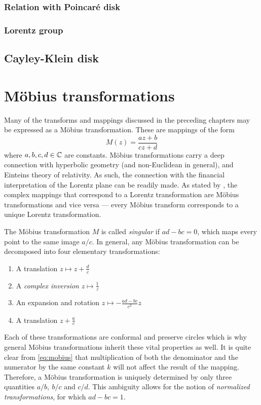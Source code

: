 \subsubsection{Relation with Poincaré disk}

\subsubsection{Lorentz group}

\subsection{Cayley-Klein disk}

\section{Möbius transformations}
\label{sec:mobius}
Many of the transforms and mappings discussed in the preceding chapters may be expressed as a Möbius transformation. These are mappings of the form \cite{Needham1997}
\begin{equation}
    M(z) = \frac{az + b}{cz + d}
    \label{eq:mobius}
\end{equation}
where \(a, b, c, d \in \mathbb{C} \) are constants. Möbius transformations carry a deep connection with hyperbolic geometry (and non-Euclidean in general), and Einteins theory of relativity. As such, the connection with the financial interpretation of the Lorentz plane can be readily made. As stated by \citet{Needham1997}, the complex mappings that correspond to a Lorentz transformation are Möbius transformations and vice versa --- every Möbius transform corresponds to a unique Lorentz transformation.

The Möbius transformation \(M\) is called \emph{singular} if \(ad - bc = 0\), which maps every point to the same image \(a/c\). In general, any Möbius transformation can be decomposed into four elementary transformations:
\begin{enumerate}
    \item A translation \(z \mapsto z + \frac{d}{c}\)
    \item A \emph{complex inversion} \(z \mapsto \frac{1}{z}\)
    \item An expansion and rotation \(z \mapsto -\frac{ad - bc}{c^2}z\)
    \item A translation \(z + \frac{a}{c}\)
\end{enumerate}
Each of these transformations are conformal and preserve circles which is why general Möbius transformations inherit these vital properties as well. It is quite clear from \cref{eq:mobius} that multiplication of both the denominator and the numerator by the same constant \(k\) will not affect the result of the mapping. Therefore, a Möbius transformation is uniquely determined by only three quantities \(a/b,\ b/c\) and \(c/d\). This ambiguity allows for the notion of \emph{normalized transformations}, for which \(ad - bc = 1\). 

